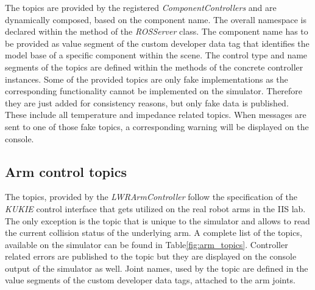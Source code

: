 The topics are provided by the registered \emph{ComponentControllers} and are dynamically composed, based on the component name. The overall namespace is declared within the  method of the \emph{ROSServer} class. The component name has to be provided as value segment of the custom developer data tag that identifies the model base of a specific component within the scene. The control type and name segments of the topics are defined within the  methods of the concrete controller instances. Some of the provided topics are only fake implementations as the corresponding functionality cannot be implemented on the simulator. Therefore they are just added for consistency reasons, but only fake data is published. These include all temperature and impedance related topics. When messages are sent to one of those fake topics, a corresponding warning will be displayed on the console.

\subsection{Arm control topics}

The topics, provided by the \emph{LWRArmController} follow the specification of the \emph{KUKIE} control interface that gets utilized on the real robot arms in the IIS lab. The only exception is the  topic that is unique to the simulator and allows to read the current collision status of the underlying arm. A complete list of the topics, available on the simulator can be found in Table\ref{fig:arm_topics}. Controller related errors are published to the  topic but they are displayed on the console output of the simulator as well. Joint names, used by the  topic are defined in the value segments of the custom developer data tags, attached to the arm joints.

